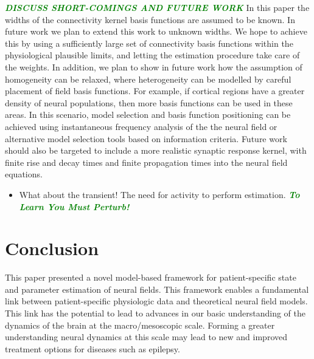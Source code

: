 \documentclass[12pt]{iopart}
\newcommand{\omg}[1]{\textsf{\emph{\textbf{\textcolor{green}{#1}}}}}
\begin{document}
\omg{DISCUSS SHORT-COMINGS AND FUTURE WORK}
In this paper the widths of the connectivity kernel basis functions are assumed to be known. In future work we plan to extend this work to unknown widths. We hope to achieve this by using a sufficiently large set of connectivity basis functions within the physiological plausible limits, and letting the estimation procedure take care of the weights. In addition, we plan to show in future work how the assumption of homogeneity can be relaxed, where heterogeneity can be modelled by careful placement of field basis functions. For example, if cortical regions have a greater density of neural populations, then more basis functions can be used in these areas. In this scenario, model selection and basis function positioning can be achieved using instantaneous frequency analysis of the the neural field or alternative model selection tools based on information criteria. Future work should also be targeted to include a more realistic synaptic response kernel, with finite rise and decay times and finite propagation times into the neural field equations.

\begin{itemize}
	\item What about the transient! The need for activity to perform estimation. \omg{To Learn You Must Perturb!} 
\end{itemize}

\section{Conclusion}\label{ConclusionSection}
This paper presented a novel model-based framework for patient-specific state and parameter estimation of neural fields. This framework enables a fundamental link between patient-specific physiologic data and theoretical neural field models. This link has the potential to lead to advances in our basic understanding of the dynamics of the brain at the macro/mesoscopic scale. Forming a greater understanding neural dynamics at this scale may lead to new and improved treatment options for diseases such as epilepsy.

\appendix 
\end{document}
